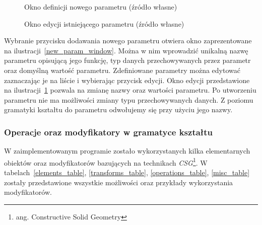 \begin{figure}[h]
  \centering
  \caption{Okno definicji nowego parametru (źródło własne)}
  \label{new_param_window}
  \quad
  \caption{Okno edycji istniejącego parametru (źródło własne)}
  \label{edit_param_window}
\end{figure}
Wybranie przycisku dodawania nowego parametru otwiera okno zaprezentowane na
ilustracji~\ref{new_param_window}. Można w nim wprowadzić unikalną nazwę
parametru opisującą jego funkcję, typ danych przechowywanych przez parametr oraz domyślną
wartość parametru. Zdefiniowane parametry można edytować zaznaczając je na
liście i wybierając przycisk edycji. Okno edycji przedstawione na
ilustracji~\ref{edit_param_window} pozwala na zmianę nazwy oraz wartości
parametru. Po utworzeniu parametru nie ma możliwości zmiany typu przechowywanych danych.
Z poziomu gramatyki kształtu do parametru odwołujemy się przy użyciu jego nazwy.

\subsubsection{Operacje oraz modyfikatory w gramatyce kształtu}
W zaimplementowanym programie zostało wykorzystanych kilka elementarnych obiektów oraz
modyfikatorów bazujących na technikach \emph{CSG}\footnote{ang. Constructive
Solid Geometry}. W tabelach~\ref{elements_table}, \ref{transforms_table},
\ref{operations_table}, \ref{misc_table} zostały przedstawione wszystkie
możliwości oraz przykłady wykorzystania modyfikatorów.

